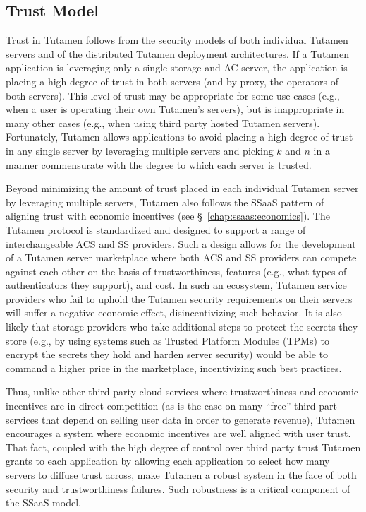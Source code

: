 \subsection{Trust Model}

Trust in Tutamen follows from the security models of both individual
Tutamen servers and of the distributed Tutamen deployment
architectures. If a Tutamen application is leveraging only a single
storage and AC server, the application is placing a high degree of
trust in both servers (and by proxy, the operators of both
servers). This level of trust may be appropriate for some use cases
(e.g., when a user is operating their own Tutamen's servers), but is
inappropriate in many other cases (e.g., when using third party hosted
Tutamen servers). Fortunately, Tutamen allows applications to avoid
placing a high degree of trust in any single server by leveraging
multiple servers and picking $k$ and $n$ in a manner commensurate with
the degree to which each server is trusted.

Beyond minimizing the amount of trust placed in each individual
Tutamen server by leveraging multiple servers, Tutamen also follows
the SSaaS pattern of aligning trust with economic incentives (see
\S~\ref{chap:ssaas:economics}). The Tutamen protocol is standardized
and designed to support a range of interchangeable ACS and SS
providers. Such a design allows for the development of a Tutamen
server marketplace where both ACS and SS providers can compete against
each other on the basis of trustworthiness, features (e.g., what types
of authenticators they support), and cost. In such an ecosystem,
Tutamen service providers who fail to uphold the Tutamen security
requirements on their servers will suffer a negative economic effect,
disincentivizing such behavior. It is also likely that storage
providers who take additional steps to protect the secrets they store
(e.g., by using systems such as Trusted Platform Modules (TPMs) to
encrypt the secrets they hold and harden server security) would be
able to command a higher price in the marketplace, incentivizing such
best practices.

Thus, unlike other third party cloud services where trustworthiness
and economic incentives are in direct competition (as is the case on
many ``free'' third part services that depend on selling user data in
order to generate revenue), Tutamen encourages a system where economic
incentives are well aligned with user trust. That fact, coupled with
the high degree of control over third party trust Tutamen grants to
each application by allowing each application to select how many
servers to diffuse trust across, make Tutamen a robust system in the
face of both security and trustworthiness failures. Such robustness is
a critical component of the SSaaS model.

